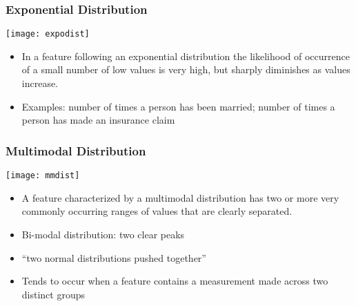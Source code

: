 \begin{frame}[fragile] \frametitle{Exponential Distribution}
\begin{center}
\texttt{[image: expodist]}
\end{center}

\begin{itemize}
\item In a feature following an exponential distribution the likelihood of occurrence of a small number of low values is very high, but sharply diminishes as values increase. 
\item Examples: number of times a person has been married; number of times a person has made an insurance claim
\end{itemize}
\end{frame}


\begin{frame}[fragile] \frametitle{Multimodal Distribution}

\begin{center}
\texttt{[image: mmdist]}
\end{center}

\begin{itemize}
\item A feature characterized by a multimodal distribution has two or more very commonly occurring ranges of values that are clearly separated. 
\item Bi-modal distribution: two clear peaks
\item ``two normal distributions pushed together''
\item Tends to occur when a feature contains a measurement made across two distinct groups
\end{itemize}
\end{frame}



%





